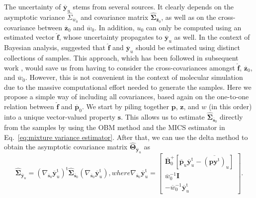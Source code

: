 \documentclass[journal=jctcce,manuscript=article,layout=twocolumn]{achemso}
\newcommand{\mt}[1]{\boldsymbol{\mathbf{#1}}}   %
\newcommand{\vt}[1]{\boldsymbol{\mathbf{#1}}}   %
\newcommand{\tr}[1]{#1^\text{t}}                %
\newcommand{\avg}[1]{\overline{#1}}             %
\begin{document}
The uncertainty of $\avg{\vt y}_u$ stems from several sources. It clearly depends on the asymptotic variance $\hat \Sigma_{\avg w_0}$ and covariance matrix $\hat{\mt \Sigma}_{\avg{\vt z}_0}$, as well as on the cross-covariance between $\avg{\vt z}_0$ and $\avg w_0$. In addition, $u_0$ can only be computed using an estimated vector $\hat{\vt f}$, whose uncertainty propagates to $\avg{\vt y}_u$ as well. In the context of Bayesian analysis, \citeauthor{Buta_2011} \cite{Buta_2011} suggested that $\hat{\vt f}$ and $\avg{\vt y}_u$ should be estimated using distinct collections of samples. This approach, which has been followed in subsequent work \cite{Tan_2015, Roy_2018}, would save us from having to consider the cross-covariances amongst $\hat{\vt f}$, $\avg{\vt z}_0$, and $\avg w_0$. However, this is not convenient in the context of molecular simulation due to the massive computational effort needed to generate the samples. Here we propose a simple way of including all covariances, based again on the one-to-one relation between $\hat{\vt f}$ and $\avg{\vt p}_0$. We start by piling together $\vt p$, $\vt z$, and $w$ (in this order) into a unique vector-valued property $\vt s$. This allows us to estimate $\hat{\mt \Sigma}_{\avg{\vt s}_0}$ directly from the samples by using the OBM method and the MICS estimator in Eq.~\eqref{eq:mixture variance estimator}. After that, we can use the delta method to obtain the asymptotic covariance matrix $\hat{\mt \Theta}_{\avg{\vt y}_u}$ as
\begin{subequations}
\label{eq:mics reweighting}
\begin{equation}
\label{eq:mics reweighting delta method}
\hat{\mt \Sigma}_{\avg{\vt y}_u} = \tr{(\nabla_{\avg{\vt s}_0} {\tr{\avg{\vt y}}_u})} \hat{\mt \Sigma}_{\avg{\vt s}_0} (\nabla_{\avg{\vt s}_0} {\tr{\avg{\vt y}}_u}),
\end{equation}
where
\begin{equation}
\label{eq:mics reweighting gradient}
\nabla_{\avg{\vt s}_0} \tr{\avg{\vt y}}_u = \left[\begin{array}{c}
\avg{\mt B}_0^+ [\avg{\vt p}_u \tr{\avg{\vt y}}_u - \avg{(\vt p \tr{\vt y})}_u] \\
\avg{w}_0^{-1} {\mt I} \\
-\avg{w}_0^{-1} \tr{\avg{\vt y}}_u
\end{array}\right].
\end{equation}
\end{subequations}
\end{document}
